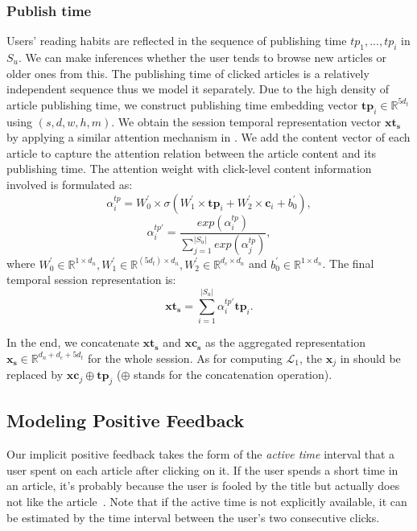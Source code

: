 \subsubsection{Publish time}
Users' reading habits are reflected in the sequence of publishing time ${tp_1,...,tp_i}$ in $S_u$. We can make inferences whether the user tends to browse new articles or older ones from this. The publishing time of clicked articles is a relatively independent sequence thus we model it separately. Due to the high density of article publishing time, we construct publishing time embedding vector $\mathbf{tp}_i\in \mathbb{R}^{5d_t}$ using $(s, d, w, h, m)$. We obtain the session temporal representation vector $\mathbf{xt_s}$ by applying a similar attention mechanism in . We add the content vector of each article to capture the attention relation between the article content and its publishing time. The attention weight with click-level content information involved is formulated as:
\begin{equation}
    \alpha_i^{tp} = W_0^{\prime} \times \sigma (W_1^{\prime} \times \mathbf{tp}_i + W_2^{\prime} \times \mathbf{c}_i + b_0^{\prime}),
\end{equation}
\begin{equation}
    \alpha_i^{tp\prime} = \frac{exp(\alpha_i^{tp})}{\sum_{j=1}^{|S_u|}exp(\alpha_j^{tp})},
\end{equation}
where $W_0^{\prime}\in \mathbb{R}^{1 \times d_n}, W_1^{\prime} \in \mathbb{R}^{(5d_t)\times d_n}, W_2^{\prime} \in \mathbb{R}^{d_c\times d_n}$ and $b_0^{\prime} \in \mathbb{R}^{1 \times d_n}$. The final temporal session representation is:
\begin{equation}
    \mathbf{xt_s} = \sum_{i=1}^{|S_u|} \alpha_i^{tp\prime} \mathbf{tp}_i.
\end{equation}

In the end, we concatenate $\mathbf{xt_s}$ and $\mathbf{xc_s}$ as the aggregated representation $\mathbf{x_s} \in \mathbb{R}^{d_n+d_c+5d_t} $ for the whole session. As for computing $\mathcal{L}_1$, the $\mathbf{x}_j$ in  should be replaced by $\mathbf{xc}_j \oplus \mathbf{tp}_j$ ($\oplus$ stands for the concatenation operation).

\subsection{Modeling Positive Feedback}
\label{sec:positive feedback}
Our implicit positive feedback takes the form of the \textit{active time} interval that 
a user spent on each article after clicking on it. If the user spends a short time 
in an article, it's probably because the user is fooled by the title but actually does not like 
the article~\cite{lu_quality_2019}. Note that if the active time is not explicitly available, 
it can be estimated by the time interval between the user's two consecutive clicks. 

